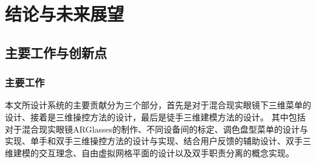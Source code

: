 
\chapter{结论与未来展望}
\label{chap:conclusion}

\section{主要工作与创新点}
\subsection{主要工作}
本文所设计系统的主要贡献分为三个部分，首先是对于混合现实眼镜下三维菜单的设计、接着是三维操控方法的设计，最后是徒手三维建模方法的设计。
其中包括对于混合现实眼镜ARGlasses的制作、不同设备间的标定、调色盘型菜单的设计与实现、单手和双手三维操控方法的设计与实现、结合用户反馈的辅助设计、双手三维建模的交互理念、自由虚拟网格平面的设计以及双手职责分离的概念实现。
